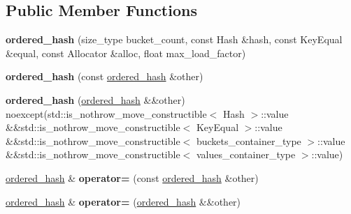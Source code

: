 \subsection*{Public Member Functions}
\begin{DoxyCompactItemize}
\item 
\mbox{\label{classtsl_1_1detail__ordered__hash_1_1ordered__hash_a37fbdae4f952ecbd6319ae95941cf94f}} 
{\bfseries ordered\+\_\+hash} (size\+\_\+type bucket\+\_\+count, const Hash \&hash, const Key\+Equal \&equal, const Allocator \&alloc, float max\+\_\+load\+\_\+factor)
\item 
\mbox{\label{classtsl_1_1detail__ordered__hash_1_1ordered__hash_af76f112b95413d15a6f0324cf7450238}} 
{\bfseries ordered\+\_\+hash} (const \mbox{\hyperlink{classtsl_1_1detail__ordered__hash_1_1ordered__hash}{ordered\+\_\+hash}} \&other)
\item 
\mbox{\label{classtsl_1_1detail__ordered__hash_1_1ordered__hash_a9acd5769e752364d37e5f159f57fb6c6}} 
{\bfseries ordered\+\_\+hash} (\mbox{\hyperlink{classtsl_1_1detail__ordered__hash_1_1ordered__hash}{ordered\+\_\+hash}} \&\&other) noexcept(std\+::is\+\_\+nothrow\+\_\+move\+\_\+constructible$<$ Hash $>$\+::value \&\&std\+::is\+\_\+nothrow\+\_\+move\+\_\+constructible$<$ Key\+Equal $>$\+::value \&\&std\+::is\+\_\+nothrow\+\_\+move\+\_\+constructible$<$ buckets\+\_\+container\+\_\+type $>$\+::value \&\&std\+::is\+\_\+nothrow\+\_\+move\+\_\+constructible$<$ values\+\_\+container\+\_\+type $>$\+::value)
\item 
\mbox{\label{classtsl_1_1detail__ordered__hash_1_1ordered__hash_aa04c698d1b4195c7f3a27d3559c75c84}} 
\mbox{\hyperlink{classtsl_1_1detail__ordered__hash_1_1ordered__hash}{ordered\+\_\+hash}} \& {\bfseries operator=} (const \mbox{\hyperlink{classtsl_1_1detail__ordered__hash_1_1ordered__hash}{ordered\+\_\+hash}} \&other)
\item 
\mbox{\label{classtsl_1_1detail__ordered__hash_1_1ordered__hash_a6256e335e27d395623051c76b615b8dc}} 
\mbox{\hyperlink{classtsl_1_1detail__ordered__hash_1_1ordered__hash}{ordered\+\_\+hash}} \& {\bfseries operator=} (\mbox{\hyperlink{classtsl_1_1detail__ordered__hash_1_1ordered__hash}{ordered\+\_\+hash}} \&\&other)

\end{DoxyCompactItemize}
